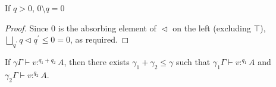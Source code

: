 \documentclass[acmsmall,screen,nonacm]{acmart}
\newcommand{\tee}{\vdash}
\DeclareMathOperator{\scale}{\mathbin{\triangleleft}}
\begin{document}
\begin{lemma}
\label{lem:zero-div}
  If $q > 0$, $0 \setminus q = 0$
\end{lemma}

\begin{proof}
  Since 0 is the absorbing element of $\scale$ on the left (excluding $\top$), $\bigsqcup\limits_{q^\prime} q \scale q^\prime \le 0 = 0$, as required.
  
\end{proof}

\begin{lemma}
\label{lem:new-modal-mode-split-2}
  If $\gamma\Gamma \tee v :^{q_1 + q_2} A$, then there exists $\gamma_1 + \gamma_2 \le \gamma$ such that $\gamma_1\Gamma \tee v :^{q_1} A$ and $\gamma_2\Gamma \tee v :^{q_2} A$.
\end{lemma}
\end{document}
